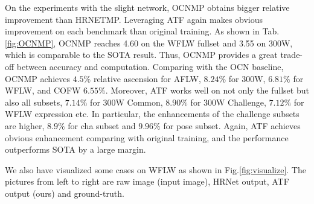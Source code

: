 \documentclass[journal,transmag]{IEEEtran}
\begin{document}

On the experiments with the slight network, OCNMP obtains bigger relative improvement than HRNETMP.
Leveraging ATF again makes obvious improvement on each benchmark than original training. 
As shown in Tab.\ref{fig:OCNMP}, OCNMP reaches 4.60 on the WFLW fullset and 3.55 on 300W, which is comparable to the SOTA result.
Thus, OCNMP provides a great trade-off between accuracy and computation.
Comparing with the OCN baseline, OCNMP achieves $4.5\%$ relative ascension for AFLW, $8.24\%$ for 300W, $6.81\%$ for WFLW, and COFW $6.55\%$.
Moreover, ATF works well on not only the fullset but also all subsets, $7.14\%$ for 300W Common, $8.90\%$ for 300W Challenge, $7.12\%$ for WFLW expression etc.
In particular, the enhancements of the challenge subsets are higher, $8.9\%$ for cha subset and $9.96\%$ for pose subset.
Again, ATF achieves obvious enhancement comparing with original training, and the performance outperforms SOTA by a large margin.

We also have visualized some cases on WFLW as shown in Fig.\ref{fig:visualize}. The pictures from left to right are  raw image (input image), HRNet\cite{HRNET} output, ATF output (ours) and ground-truth.
\end{document}
